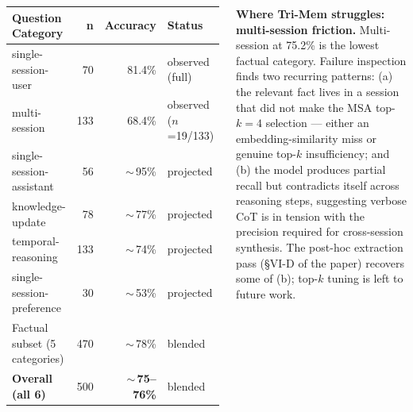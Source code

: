 \documentclass[25pt, a0paper, landscape, blockverticalspace=5mm]{tikzposter}
\begin{document}
\begin{columns}
{\begin{center}
\begin{minipage}[t]{0.48\linewidth}
                \label{tab:longmem-s}
                \vspace{0.5em}
                \footnotesize
                \begin{tabular}{@{}lrrl@{}}
                    \toprule
                    \textbf{Question Category}    & \textbf{n} & \textbf{Accuracy}           & \textbf{Status}       \\
                    \midrule
                    single-session-user           & 70         & 81.4\%                      & observed (full)       \\
                    multi-session                 & 133        & 68.4\%                      & observed ($n$=19/133) \\
                    single-session-assistant      & 56         & ${\sim}\,$95\%              & projected             \\
                    knowledge-update              & 78         & ${\sim}\,$77\%              & projected             \\
                    temporal-reasoning            & 133        & ${\sim}\,$74\%              & projected             \\
                    single-session-preference     & 30         & ${\sim}\,$53\%              & projected             \\
                    \midrule
                    Factual subset (5 categories) & 470        & ${\sim}\,$78\%              & blended               \\
                    \textbf{Overall (all 6)}      & 500        & \textbf{${\sim}\,$75--76\%} & blended               \\
                    \bottomrule
                \end{tabular}
            \end{minipage}
        \end{center}

        \vspace{0.4em}
        \textbf{Where Tri-Mem struggles: multi-session friction.} Multi-session at 75.2\% is the lowest factual category. Failure inspection finds two recurring patterns: (a) the relevant fact lives in a session that did not make the MSA top-$k{=}4$ selection --- either an embedding-similarity miss or genuine top-$k$ insufficiency; and (b) the model produces partial recall but contradicts itself across reasoning steps, suggesting verbose CoT is in tension with the precision required for cross-session synthesis. The post-hoc extraction pass (\S VI-D of the paper) recovers some of (b); top-$k$ tuning is left to future work.
    }

\end{columns}
\end{document}
